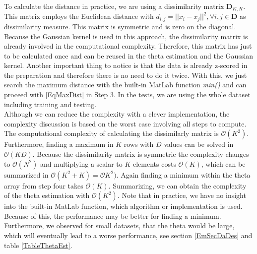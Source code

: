 \FloatBarrier
To calculate the distance in practice, we are using a dissimilarity matrix $\mathbf{D}_{K,K}$.
This matrix employs the Euclidean distance with $d_{i,j}=||x_i-x_j||^2, \forall i,j \in \mathbf{D}$ as dissimilarity measure.
This matrix is symmetric and is zero on the diagonal.\cite[p. 22,299]{Gentle.2007}\newline
Because the Gaussian kernel is used in this approach, the dissimilarity matrix is already involved in the computational complexity.
Therefore, this matrix has just to be calculated once and can be reused in the theta estimation and the Gaussian kernel.
Another important thing to notice is that the data is already z-scored in the preparation and therefore there is no need to do it twice.
With this, we just search the maximum distance with the built-in MatLab function \textit{min()} and can proceed with \eqref{EqMaxDist} in Step 3.
In the tests, we are using the whole dataset including training and testing.\\
Although we can reduce the complexity with a clever implementation, the complexity discussion is based on the worst case involving all steps to compute.
The computational complexity of calculating the dissimilarly matrix is $\mathcal{O}(K^2)$.\cite{Kobti.2007}
Furthermore, finding a maximum in $K$ rows with $D$ values can be solved in $\mathcal{O}(KD)$.
Because the dissimilarity matrix is symmetric the complexity changes to $\mathcal{O}(N^2)$ and multiplying a scalar to $K$ elements costs $\mathcal{O}(K)$, which can be summarized in $\mathcal{O}(K^2+K)=\mathcal{O}K^2)$.
Again finding a minimum within the theta array from step four takes $\mathcal{O}(K)$.
Summarizing, we can obtain the complexity of the theta estimation with $\mathcal{O}(K^2)$.
Note that in practice, we have no insight into the built-in MatLab function, which algorithm or implementation is used.
Because of this, the performance may be better for finding a minimum.
Furthermore, we observed for small datasets, that the theta would be large, which will eventually lead to a worse performance, see section \ref{EmSecDaDes} and table \ref{TableThetaEst}.
